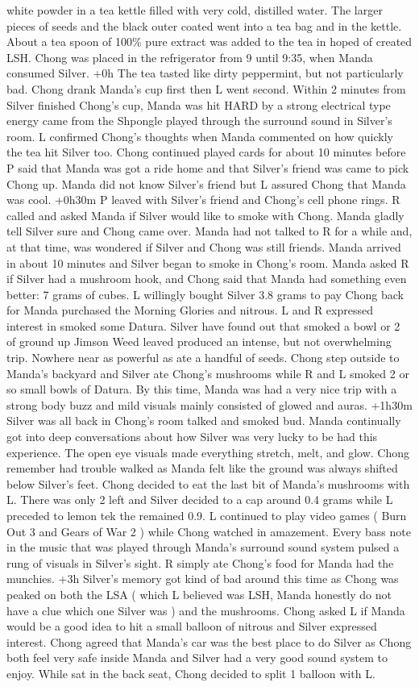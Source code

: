 \documentclass[12pt]{book}
\begin{document}
white powder in a tea kettle filled with very cold, distilled water. The larger pieces of seeds and the black outer coated went into a tea bag and in the kettle. About a tea spoon of 100\% pure extract was added to the tea in hoped of created LSH. Chong was placed in the refrigerator from 9 until 9:35, when Manda consumed Silver. +0h The tea tasted like dirty peppermint, but not particularly bad. Chong drank Manda's cup first then L went second. Within 2 minutes from Silver finished Chong's cup, Manda was hit HARD by a strong electrical type energy came from the Shpongle played through the surround sound in Silver's room. L confirmed Chong's thoughts when Manda commented on how quickly the tea hit Silver too. Chong continued played cards for about 10 minutes before P said that Manda was got a ride home and that Silver's friend was came to pick Chong up. Manda did not know Silver's friend but L assured Chong that Manda was cool. +0h30m P leaved with Silver's friend and Chong's cell phone rings. R called and asked Manda if Silver would like to smoke with Chong. Manda gladly tell Silver sure and Chong came over. Manda had not talked to R for a while and, at that time, was wondered if Silver and Chong was still friends. Manda arrived in about 10 minutes and Silver began to smoke in Chong's room. Manda asked R if Silver had a mushroom hook, and Chong said that Manda had something even better: 7 grams of cubes. L willingly bought Silver 3.8 grams to pay Chong back for Manda purchased the Morning Glories and nitrous. L and R expressed interest in smoked some Datura. Silver have found out that smoked a bowl or 2 of ground up Jimson Weed leaved produced an intense, but not overwhelming trip. Nowhere near as powerful as ate a handful of seeds. Chong step outside to Manda's backyard and Silver ate Chong's mushrooms while R and L smoked 2 or so small bowls of Datura. By this time, Manda was had a very nice trip with a strong body buzz and mild visuals mainly consisted of glowed and auras. +1h30m Silver was all back in Chong's room talked and smoked bud. Manda continually got into deep conversations about how Silver was very lucky to be had this experience. The open eye visuals made everything stretch, melt, and glow. Chong remember had trouble walked as Manda felt like the ground was always shifted below Silver's feet. Chong decided to eat the last bit of Manda's mushrooms with L. There was only 2 left and Silver decided to a cap around 0.4 grams while L preceded to lemon tek the remained 0.9. L continued to play video games ( Burn Out 3 and Gears of War 2 ) while Chong watched in amazement. Every bass note in the music that was played through Manda's surround sound system pulsed a rung of visuals in Silver's sight. R simply ate Chong's food for Manda had the munchies. +3h Silver's memory got kind of bad around this time as Chong was peaked on both the LSA ( which L believed was LSH, Manda honestly do not have a clue which one Silver was ) and the mushrooms. Chong asked L if Manda would be a good idea to hit a small balloon of nitrous and Silver expressed interest. Chong agreed that Manda's car was the best place to do Silver as Chong both feel very safe inside Manda and Silver had a very good sound system to enjoy. While sat in the back seat, Chong decided to split 1 balloon with L. 
\end{document}
